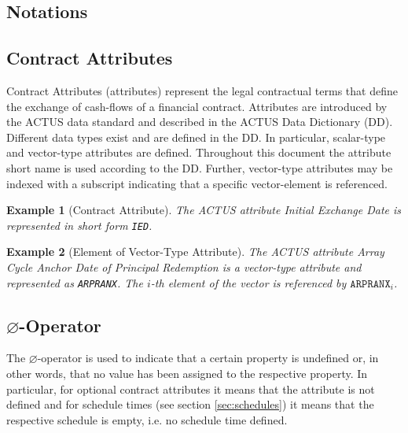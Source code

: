 \documentclass[9pt,oneside]{amsart}
\newtheorem{example}{Example}
\newcommand{\attr}[1]{\texttt{#1}}
\newcommand{\undef}{\varnothing}
\begin{document}
\setlength{\columnsep}{20pt}
\begin{multicols}{2}



\section{Notations}\label{sec:notations}

\subsection{Contract Attributes }

Contract Attributes (attributes) represent the legal contractual terms that define the exchange of cash-flows of a financial contract. Attributes are introduced by the ACTUS data standard and described in the ACTUS Data Dictionary (DD). Different data types exist and are defined in the DD. In particular, scalar-type and vector-type attributes are defined. Throughout this document the attribute short name is used according to the DD. Further, vector-type attributes may be indexed with a subscript indicating that a specific vector-element is referenced.

\begin{example}[Contract Attribute]
The ACTUS attribute \textit{Initial Exchange Date} is represented in short form \attr{IED}.
\end{example}


\begin{example}[Element of Vector-Type Attribute]
The ACTUS attribute \textit{Array Cycle Anchor Date of Principal Redemption} is a vector-type attribute and represented as \attr{ARPRANX}. The $i$-th element of the vector is referenced by $\attr{ARPRANX}_i$.
\end{example}

\subsection{$\undef$-Operator}

The $\undef$-operator is used to indicate that a certain property is undefined or, in other words, that no value has been assigned to the respective property. In particular, for optional contract attributes it means that the attribute is not defined and for schedule times (see section \ref{sec:schedules}) it means that the respective schedule is empty, i.e. no schedule time defined.


\end{multicols}
\end{document}
